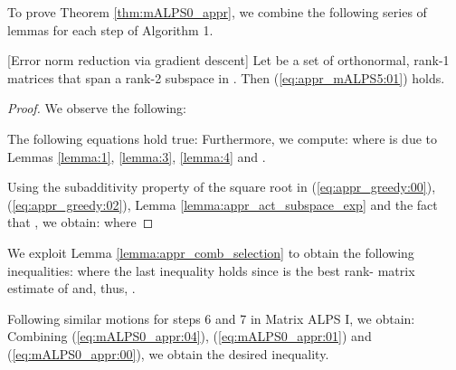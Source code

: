 \documentclass[twocolumn]{svjour3}
\begin{document}
To prove Theorem \ref{thm:mALPS0_appr}, we combine the following series of lemmas for each step of Algorithm 1.

\begin{lemma}{\label{lemma:appr_greedy}}[Error norm reduction via gradient descent] Let  be a set of orthonormal, rank-1 matrices that span a rank-2 subspace in . Then (\ref{eq:appr_mALPS5:01}) holds.
\begin{figure*}[!htp]

\hrulefill
\end{figure*}
\end{lemma}

\begin{proof} We observe the following:

The following equations hold true:
 Furthermore, we compute:
 where  is due to Lemmas \ref{lemma:1}, \ref{lemma:3}, \ref{lemma:4} and .

Using the subadditivity property of the square root in (\ref{eq:appr_greedy:00}), (\ref{eq:appr_greedy:02}), Lemma \ref{lemma:appr_act_subspace_exp} and the fact that , we obtain:
 where 
\end{proof}

We exploit Lemma \ref{lemma:appr_comb_selection} to obtain the following inequalities:
 where the last inequality holds since  is the best rank- matrix estimate of  and, thus, .

Following similar motions for steps 6 and 7 in Matrix ALPS I, we obtain:
 Combining (\ref{eq:mALPS0_appr:04}), (\ref{eq:mALPS0_appr:01}) and (\ref{eq:mALPS0_appr:00}), we obtain the desired inequality.



\end{document}
